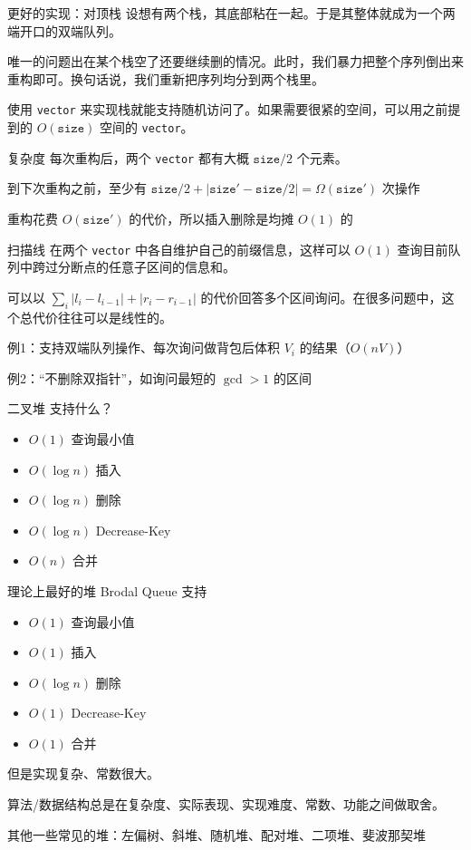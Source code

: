 \documentclass[11pt,aspectratio=169]{beamer}
\begin{document}
\begin{frame}{更好的实现：对顶栈}
    设想有两个栈，其底部粘在一起。于是其整体就成为一个两端开口的双端队列。

    唯一的问题出在某个栈空了还要继续删的情况。此时，我们暴力把整个序列倒出来重构即可。换句话说，我们重新把序列均分到两个栈里。

    使用 \texttt{vector} 来实现栈就能支持随机访问了。如果需要很紧的空间，可以用之前提到的 $O(\mathtt{size})$ 空间的 \texttt{vector}。
\end{frame}
\begin{frame}{复杂度}
    每次重构后，两个 \texttt{vector} 都有大概 $\mathtt{size}/2$ 个元素。

    到下次重构之前，至少有 $\mathtt{size}/2+|\mathtt{size}'-\mathtt{size}/2|=\Omega(\mathtt{size}')$ 次操作

    重构花费 $O(\mathtt{size}')$ 的代价，所以插入删除是均摊 $O(1)$ 的
\end{frame}
\begin{frame}{扫描线}
    在两个 \texttt{vector} 中各自维护自己的前缀信息，这样可以 $O(1)$ 查询目前队列中跨过分断点的任意子区间的信息和。

    可以以 $\sum_i |l_i-l_{i-1}|+|r_i-r_{i-1}|$ 的代价回答多个区间询问。在很多问题中，这个总代价往往可以是线性的。

    例1：支持双端队列操作、每次询问做背包后体积 $V_i$ 的结果（$O(nV)$）

    例2：“不删除双指针”，如询问最短的 $\gcd>1$ 的区间
\end{frame}
\begin{frame}{二叉堆}
    支持什么？

    \begin{itemize}
        \item $O(1)$ 查询最小值
        \item $O(\log n)$ 插入
        \item $O(\log n)$ 删除
        \item $O(\log n)$ Decrease-Key
        \item $O(n)$ 合并
    \end{itemize}
\end{frame}
\begin{frame}{理论上最好的堆}
    Brodal Queue 支持
    \begin{itemize}
        \item $O(1)$ 查询最小值
        \item $O(1)$ 插入
        \item $O(\log n)$ 删除
        \item $O(1)$ Decrease-Key
        \item $O(1)$ 合并
    \end{itemize}

    但是实现复杂、常数很大。

    算法/数据结构总是在复杂度、实际表现、实现难度、常数、功能之间做取舍。

    其他一些常见的堆：左偏树、斜堆、随机堆、配对堆、二项堆、斐波那契堆
\end{frame}
\end{document}
